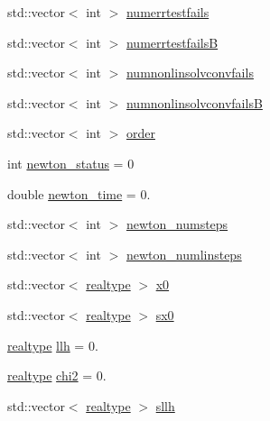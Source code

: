 \begin{DoxyCompactItemize}
\item 
std\+::vector$<$ int $>$ \mbox{\hyperlink{classamici_1_1_return_data_aea0bfe23fb5971a5348a3d017a859488}{numerrtestfails}}
\item 
std\+::vector$<$ int $>$ \mbox{\hyperlink{classamici_1_1_return_data_a894f4cf4dbdd38dda12c5730fb04482d}{numerrtestfailsB}}
\item 
std\+::vector$<$ int $>$ \mbox{\hyperlink{classamici_1_1_return_data_a67818adc34db21fb3d78731c0e60462a}{numnonlinsolvconvfails}}
\item 
std\+::vector$<$ int $>$ \mbox{\hyperlink{classamici_1_1_return_data_a9150501f058304e49bb6a52152cc9550}{numnonlinsolvconvfailsB}}
\item 
std\+::vector$<$ int $>$ \mbox{\hyperlink{classamici_1_1_return_data_a75a1634d2dab77d47af4eb58e6dc965e}{order}}
\item 
int \mbox{\hyperlink{classamici_1_1_return_data_a7a12031049f81ccdd4496bd4506c6d28}{newton\+\_\+status}} = 0
\item 
double \mbox{\hyperlink{classamici_1_1_return_data_a6a66e25a5f5073ee559f22e82e0dee1f}{newton\+\_\+time}} = 0.
\item 
std\+::vector$<$ int $>$ \mbox{\hyperlink{classamici_1_1_return_data_ae8d9136bb7510303556f9935a15b9318}{newton\+\_\+numsteps}}
\item 
std\+::vector$<$ int $>$ \mbox{\hyperlink{classamici_1_1_return_data_a08ca5d9be9ff8f50955327334e5e87bb}{newton\+\_\+numlinsteps}}
\item 
std\+::vector$<$ \mbox{\hyperlink{namespaceamici_a1bdce28051d6a53868f7ccbf5f2c14a3}{realtype}} $>$ \mbox{\hyperlink{classamici_1_1_return_data_a9089beccffa9671a052e3065166dce53}{x0}}
\item 
std\+::vector$<$ \mbox{\hyperlink{namespaceamici_a1bdce28051d6a53868f7ccbf5f2c14a3}{realtype}} $>$ \mbox{\hyperlink{classamici_1_1_return_data_a83cf74df5a7fee8ee66f882b898e7b63}{sx0}}
\item 
\mbox{\hyperlink{namespaceamici_a1bdce28051d6a53868f7ccbf5f2c14a3}{realtype}} \mbox{\hyperlink{classamici_1_1_return_data_a35c3d895b14746807521fa6ba8ead52b}{llh}} = 0.
\item 
\mbox{\hyperlink{namespaceamici_a1bdce28051d6a53868f7ccbf5f2c14a3}{realtype}} \mbox{\hyperlink{classamici_1_1_return_data_a473f438e422f5fbf6c5753a95b3324fe}{chi2}} = 0.
\item 
std\+::vector$<$ \mbox{\hyperlink{namespaceamici_a1bdce28051d6a53868f7ccbf5f2c14a3}{realtype}} $>$ \mbox{\hyperlink{classamici_1_1_return_data_a1696cb94c7712b468ee3e021c6df0c89}{sllh}}

\end{DoxyCompactItemize}
